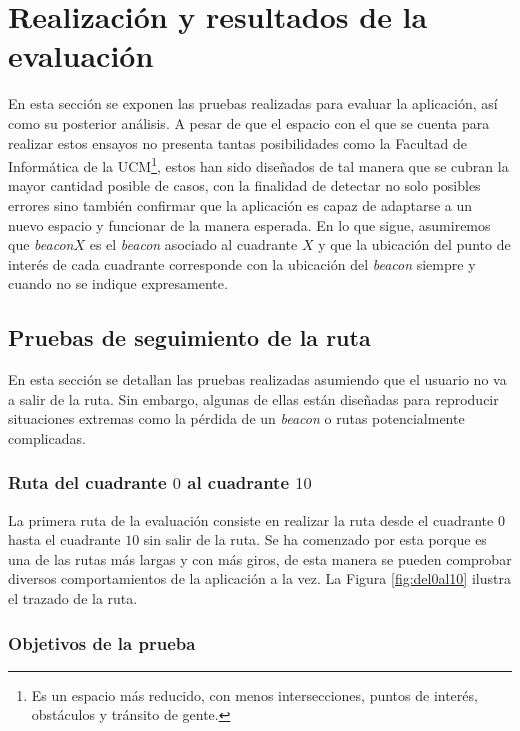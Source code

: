 \section{Realización y resultados de la evaluación}
\label{sec:realizYresult}

En esta sección se exponen las pruebas realizadas para evaluar la aplicación, así como su posterior análisis. A pesar de que el espacio con el que se cuenta para realizar estos ensayos no presenta tantas posibilidades como la Facultad de Informática de la UCM\footnote{Es un espacio más reducido, con menos intersecciones, puntos de interés, obstáculos y tránsito de gente.}, estos han sido diseñados de tal manera que se cubran la mayor cantidad posible de casos, con la finalidad de detectar no solo posibles errores sino también confirmar que la aplicación es capaz de adaptarse a un nuevo espacio y funcionar de la manera esperada. En lo que sigue, asumiremos que \textit{beacon$X$} es el \textit{beacon} asociado al cuadrante $X$ y que la ubicación del punto de interés de cada cuadrante corresponde con la ubicación del \textit{beacon} siempre y cuando no se indique expresamente. 

\subsection{ Pruebas de seguimiento de la ruta}
En esta sección se detallan las pruebas realizadas asumiendo que el usuario no va a salir de la ruta. Sin embargo, algunas de ellas están diseñadas para reproducir situaciones extremas como la pérdida de un \textit{beacon} o rutas potencialmente complicadas.


\subsubsection{Ruta del cuadrante $0$ al cuadrante $10$}
\label{subsub:0al10}
La primera ruta de la evaluación consiste en realizar la ruta desde el cuadrante $0$ hasta el cuadrante $10$ sin salir de la ruta. Se ha comenzado por esta porque es una de las rutas más largas y con más giros, de esta manera se pueden comprobar diversos comportamientos de la aplicación a la vez. La Figura \ref{fig:del0al10} ilustra el trazado de la ruta.


\subsubsection*{Objetivos de la prueba}

